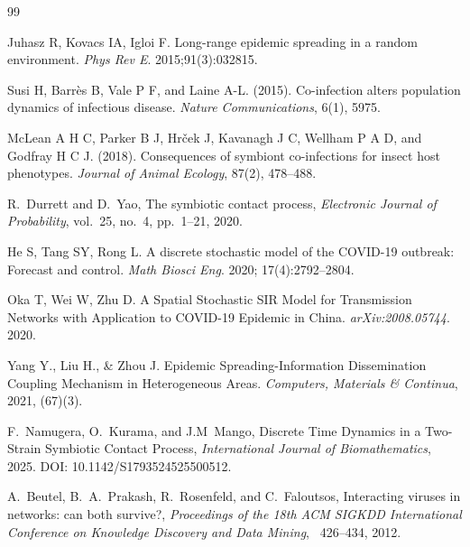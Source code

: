 \documentclass[a4paper,12pt]{scrartcl}
\theoremstyle{plain}%
\theoremstyle{definition}
\theoremstyle{remark}
\numberwithin{equation}{section}
\begin{document}
{\begin{thebibliography}{99}

Juhasz R, Kovacs IA, Igloi F. Long-range epidemic spreading in a random environment. \emph{Phys Rev E}. 2015;91(3):032815.

Susi H, Barr{\`e}s B, Vale P F, and Laine A-L. (2015).
\newblock Co-infection alters population dynamics of infectious disease.
\newblock \emph{Nature Communications}, 6(1), 5975.

McLean A H C, Parker B J, Hr{\v{c}}ek J, Kavanagh J C, Wellham P A D, and Godfray H C J. (2018).
\newblock Consequences of symbiont co-infections for insect host phenotypes.
\newblock \emph{Journal of Animal Ecology}, 87(2), 478--488.

R.~Durrett and D.~Yao, The symbiotic contact process, \textit{Electronic Journal of Probability}, vol.~25, no.~4, pp.~1--21, 2020.

He S, Tang SY, Rong L. A discrete stochastic model of the COVID-19 outbreak: Forecast and control. \emph{Math Biosci Eng}. 2020; 17(4):2792--2804.

Oka T, Wei W, Zhu D. A Spatial Stochastic SIR Model for Transmission Networks with Application to COVID-19 Epidemic in China. \emph{arXiv:2008.05744}. 2020.



Yang Y., Liu H., \& Zhou J. Epidemic Spreading-Information Dissemination Coupling Mechanism in Heterogeneous Areas. \textit{Computers, Materials \& Continua}, 2021, (67)(3).

F.~Namugera, O.~Kurama, and J.M~Mango, Discrete Time Dynamics in a Two-Strain Symbiotic Contact Process, \textit{International Journal of Biomathematics}, 2025. DOI: 10.1142/S1793524525500512.

A.~Beutel, B.~A.~Prakash, R.~Rosenfeld, and C.~Faloutsos, 
Interacting viruses in networks: can both survive?,
\textit{Proceedings of the 18th ACM SIGKDD International Conference on Knowledge Discovery and Data Mining}, ~426--434, 2012.


\end{thebibliography}}
\end{document}
